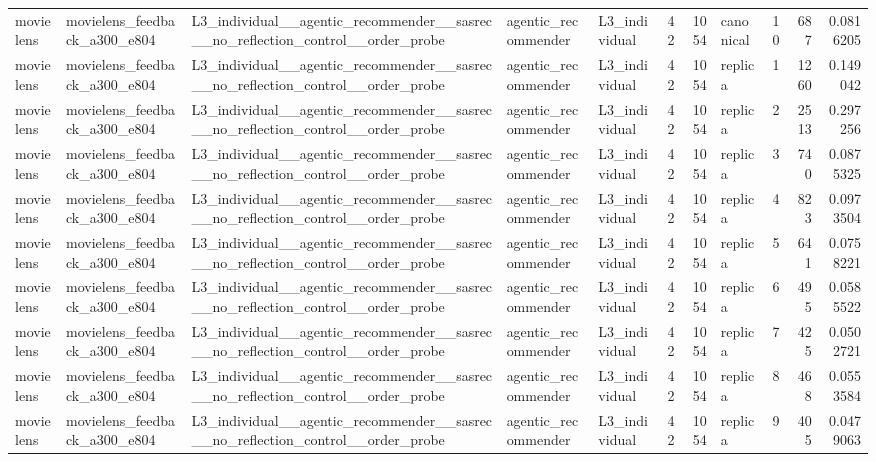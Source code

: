 \begin{table}[htbp!]
\begin{tabular}{lllllrrlrrr}
movielens & movielens\_feedback\_a300\_e804 & L3\_individual\_\_agentic\_recommender\_\_sasrec\_\_no\_reflection\_control\_\_order\_probe & agentic\_recommender & L3\_individual & 42 & 1054 & canonical & 10 & 687 & 0.0816205 \\
movielens & movielens\_feedback\_a300\_e804 & L3\_individual\_\_agentic\_recommender\_\_sasrec\_\_no\_reflection\_control\_\_order\_probe & agentic\_recommender & L3\_individual & 42 & 1054 & replica & 1 & 1260 & 0.149042 \\
movielens & movielens\_feedback\_a300\_e804 & L3\_individual\_\_agentic\_recommender\_\_sasrec\_\_no\_reflection\_control\_\_order\_probe & agentic\_recommender & L3\_individual & 42 & 1054 & replica & 2 & 2513 & 0.297256 \\
movielens & movielens\_feedback\_a300\_e804 & L3\_individual\_\_agentic\_recommender\_\_sasrec\_\_no\_reflection\_control\_\_order\_probe & agentic\_recommender & L3\_individual & 42 & 1054 & replica & 3 & 740 & 0.0875325 \\
movielens & movielens\_feedback\_a300\_e804 & L3\_individual\_\_agentic\_recommender\_\_sasrec\_\_no\_reflection\_control\_\_order\_probe & agentic\_recommender & L3\_individual & 42 & 1054 & replica & 4 & 823 & 0.0973504 \\
movielens & movielens\_feedback\_a300\_e804 & L3\_individual\_\_agentic\_recommender\_\_sasrec\_\_no\_reflection\_control\_\_order\_probe & agentic\_recommender & L3\_individual & 42 & 1054 & replica & 5 & 641 & 0.0758221 \\
movielens & movielens\_feedback\_a300\_e804 & L3\_individual\_\_agentic\_recommender\_\_sasrec\_\_no\_reflection\_control\_\_order\_probe & agentic\_recommender & L3\_individual & 42 & 1054 & replica & 6 & 495 & 0.0585522 \\
movielens & movielens\_feedback\_a300\_e804 & L3\_individual\_\_agentic\_recommender\_\_sasrec\_\_no\_reflection\_control\_\_order\_probe & agentic\_recommender & L3\_individual & 42 & 1054 & replica & 7 & 425 & 0.0502721 \\
movielens & movielens\_feedback\_a300\_e804 & L3\_individual\_\_agentic\_recommender\_\_sasrec\_\_no\_reflection\_control\_\_order\_probe & agentic\_recommender & L3\_individual & 42 & 1054 & replica & 8 & 468 & 0.0553584 \\
movielens & movielens\_feedback\_a300\_e804 & L3\_individual\_\_agentic\_recommender\_\_sasrec\_\_no\_reflection\_control\_\_order\_probe & agentic\_recommender & L3\_individual & 42 & 1054 & replica & 9 & 405 & 0.0479063 \\

\end{tabular}
\end{table}
